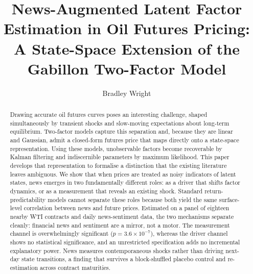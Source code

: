 \documentclass[journal]{IEEEtran}
\begin{document}
\title{News-Augmented Latent Factor Estimation in Oil Futures Pricing: A State-Space Extension of the Gabillon Two-Factor Model}

\author{Bradley Wright}

\maketitle

\begin{abstract}
Drawing accurate oil futures curves poses an interesting challenge, shaped simultaneously by transient shocks and slow-moving expectations about long-term equilibrium. Two-factor models capture this separation and, because they are linear and Gaussian, admit a closed-form futures price that maps directly onto a state-space representation. Using these models, unobservable factors become recoverable by Kalman filtering and indiscernible parameters by maximum likelihood. This paper develops that representation to formalise a distinction that the existing literature leaves ambiguous. We show that when prices are treated as noisy indicators of latent states, news emerges in two fundamentally different roles: as a driver that shifts factor dynamics, or as a measurement that reveals an existing shock. Standard return-predictability models cannot separate these roles because both yield the same surface-level correlation between news and future prices. Estimated on a panel of eighteen nearby WTI contracts and daily news-sentiment data, the two mechanisms separate cleanly: financial news and sentiment are a mirror, not a motor. The measurement channel is overwhelmingly significant ($p = 3.6 \times 10^{-7}$), whereas the driver channel shows no statistical significance, and an unrestricted specification adds no incremental explanatory power. News measures contemporaneous shocks rather than driving next-day state transitions, a finding that survives a block-shuffled placebo control and re-estimation across contract maturities.


\end{abstract}
\end{document}
